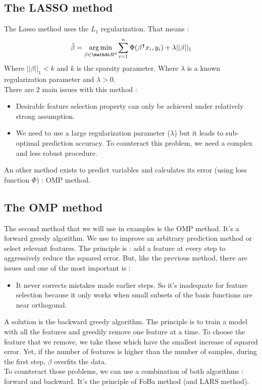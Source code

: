 \documentclass{article}
\begin{document}
\subsection{The LASSO method}
The Lasso method uses the $L_1$ regularization. That means :
\[\hat{\beta} = \underset{\beta \in \R^d}{\argmin} \sum_{i=1}^n \Phi (\trans{\beta}x_i, y_i)+ \lambda ||\beta||_1\]
Where $||\beta||_1<k$ and $k$ is the sparsity parameter. Where $\lambda$ is a known regularization parameter and $\lambda>0$.\\
There are $2$ main issues with this method : 
\begin{itemize}
    \item Desirable feature selection property can only be achieved under relatively strong assumption.
    \item We need to use a large regularization parameter ($\lambda$) but it leads to sub-optimal prediction accuracy. To counteract this problem, we need a complex and less robust procedure.
\end{itemize}
\vspace{0.5cm}
An other method exists to predict variables and calculates its error (using loss function $\Phi$) : OMP method.

\subsection{The OMP method}
The second method that we will use in examples is the OMP method. It's a forward greedy algorithm. We use to improve an arbitrary prediction method or select relevant features. The principle is : add a feature at every step to aggressively reduce the squared error. But, like the previous method, there are issues and one of the most important is :
\begin{itemize}
    \item It never corrects mistakes made earlier steps. So it's inadequate for feature selection because it only works when small subsets of the basis functions are near orthogonal.
\end{itemize}
A solution is the backward greedy algorithm. The principle is to train a model with all the features and greedily remove one feature at a time. To choose the feature that we remove, we take these which have the smallest increase of squared error. Yet, if the number of features is higher than the number of samples, during the first step, $\beta$ overfits the data.\\
To counteract those problems, we can use a combination of both algorithms : forward and backward. It's the principle of FoBa method (and LARS method).
\end{document}
